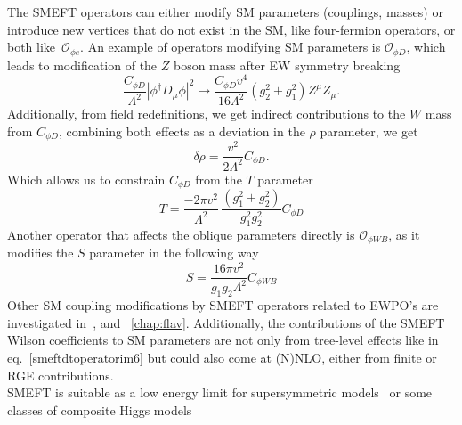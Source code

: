The SMEFT operators can either modify SM parameters (couplings, masses) or introduce new vertices that do not exist in the SM, like four-fermion operators, or both like~$\mathcal{O}_{\phi e}$. An example of operators modifying SM parameters is $ \mathcal O_{\phi D}$, which leads to modification of the $Z$ boson mass after EW symmetry breaking 
\begin{equation}
\frac{C_{\phi D}}{\Lambda^2} | \phi^\dagger D_\mu \phi |^2 \to \frac{C_{\phi D} v^4}{16 \Lambda^2 } (g_2^2+g_1^2) Z^\mu Z_\mu.
	\label{smeftdtoperatorim6}
\end{equation}
Additionally, from field redefinitions, we get indirect contributions to the $W$ mass from $C_{\phi D}$, combining both effects as a deviation in the $\rho$ parameter, we get
\begin{equation}
\delta \rho = \frac{v^2}{2 \Lambda^2} C_{\phi D}.
	\label{rhosmeft}
\end{equation}
Which allows us to constrain $C_{\phi D}$ from the $T$ parameter 
\begin{equation}
	T = \frac{-2 \pi v^2}{\Lambda^2} \, \frac{(g_1^2 +g_2^2)}{g_1^2g_2^2} C_{\phi D}
	\label{smeftT}
\end{equation}
 Another operator that affects the oblique parameters directly is $\mathcal{O}_{\phi W B}$, as it modifies the $S$ parameter in the following way
\begin{equation}
S =\frac{16 \pi v^2}{g_1 g_2 \Lambda^2} C_{\phi W B}
	\label{smeftS}
\end{equation}
Other SM coupling modifications by SMEFT operators related to EWPO's are investigated in~\cite{Alasfar:2020mne}, and ~\autoref{chap:flav}. Additionally, the contributions of the SMEFT Wilson coefficients to SM parameters are not only from tree-level effects like in eq.~\eqref{smeftdtoperatorim6} but could also come at (N)NLO, either from finite or RGE contributions.\\
SMEFT is suitable as a low energy limit for supersymmetric models~\cite{CARENA200363} or some classes of composite Higgs models~\cite{Contino:2010rs,Panico:2015jxa}
